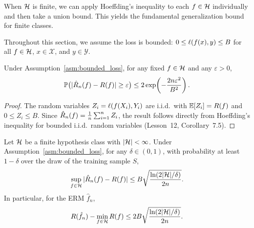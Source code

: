 \documentclass[11pt,a4paper]{article}
\begin{document}
When $\mathcal{H}$ is finite, we can apply Hoeffding's inequality to each
$f \in \mathcal{H}$ individually and then take a union bound.  This yields
the fundamental generalization bound for finite classes.

\begin{assumption}
\label{asm:bounded_loss}
Throughout this section, we assume the loss is bounded:
$0 \leq \ell(f(x), y) \leq B$ for all $f \in \mathcal{H}$, $x \in
\mathcal{X}$, and $y \in \mathcal{Y}$.
\end{assumption}

\begin{lemma}
\label{lem:pointwise}
Under Assumption~\ref{asm:bounded_loss}, for any fixed
$f \in \mathcal{H}$ and any $\varepsilon > 0$,
\[
    \mathbb{P}\bigl(|\hat{R}_n(f) - R(f)| \geq \varepsilon\bigr)
    \leq 2\exp\!\left(-\frac{2n\varepsilon^2}{B^2}\right).
\]
\end{lemma}

\begin{proof}
The random variables $Z_i = \ell(f(X_i), Y_i)$ are i.i.d.\ with
$\mathbb{E}[Z_i] = R(f)$ and $0 \leq Z_i \leq B$.  Since
$\hat{R}_n(f) = \frac{1}{n}\sum_{i=1}^n Z_i$, the result follows
directly from Hoeffding's inequality for bounded i.i.d.\ random
variables (Lesson~12, Corollary~7.5).
\end{proof}

\begin{theorem}
\label{thm:finite_class}
Let $\mathcal{H}$ be a finite hypothesis class with $|\mathcal{H}| < \infty$.
Under Assumption~\ref{asm:bounded_loss}, for any $\delta \in (0, 1)$,
with probability at least $1 - \delta$ over the draw of the training
sample $S$,
\[
    \sup_{f \in \mathcal{H}} |\hat{R}_n(f) - R(f)|
    \leq B\sqrt{\frac{\ln(2|\mathcal{H}|/\delta)}{2n}}.
\]
In particular, for the ERM $\hat{f}_n$,
\[
    R(\hat{f}_n) - \min_{f \in \mathcal{H}} R(f)
    \leq 2B\sqrt{\frac{\ln(2|\mathcal{H}|/\delta)}{2n}}.
\]
\end{theorem}
\end{document}
